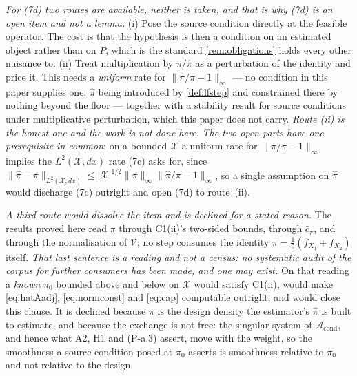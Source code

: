 \begin{remark}
\emph{For \textup{(7d)} two routes are available, neither is taken, and that is why \textup{(7d)} is an
open item and not a lemma.} \textup{(i)} Pose the source condition directly at the feasible operator.
The cost is that the hypothesis is then a condition on an estimated object rather than on $P$, which is
the standard \cref{rem:obligations} holds every other nuisance to. \textup{(ii)} Treat multiplication by
$\pi/\hat\pi$ as a perturbation of the identity and price it. This needs a \emph{uniform} rate for
$\|\hat\pi/\pi-1\|_\infty$ --- no condition in this paper supplies one, $\hat\pi$ being introduced by
\cref{def:lfstep} and constrained there by nothing beyond the floor --- together with a stability result
for source conditions under multiplicative perturbation, which this paper does not carry. \emph{Route
\textup{(ii)} is the honest one and the work is not done here.} \emph{The two open parts have one
prerequisite in common}: on a bounded $\mathcal X$ a uniform rate for $\|\hat\pi/\pi-1\|_\infty$ implies
the $L^{2}(\mathcal X,dx)$ rate \textup{(7c)} asks for, since
$\|\hat\pi-\pi\|_{L^{2}(\mathcal X,dx)}\le|\mathcal X|^{1/2}\|\pi\|_\infty\|\hat\pi/\pi-1\|_\infty$, so
a single assumption on $\hat\pi$ would discharge \textup{(7c)} outright and open \textup{(7d)} to
route~\textup{(ii)}.

\emph{A third route would dissolve the item and is declined for a stated reason.} The results proved
here read $\pi$ through C1(ii)'s two-sided bounds, through $\bar c_\pi$, and through the normalisation
of $\mathcal V$; no step consumes the identity $\pi=\tfrac12(f_{X_1}+f_{X_2})$ itself. \emph{That last
sentence is a reading and not a census: no systematic audit of the corpus for further consumers has been
made, and one may exist.} On that reading a \emph{known} $\pi_0$ bounded above and below on $\mathcal X$
would satisfy C1(ii), would make \eqref{eq:hatAadj}, \eqref{eq:normconst} and \eqref{eq:cap} computable
outright, and would close this clause. It is declined because $\pi$ is the design density the
estimator's $\hat\pi$ is built to estimate, and because the exchange is not free: the singular system of
$\mathcal A_{\mathrm{cond}}$, and hence what A2, H1 and (P-a.3) assert, move with the weight, so the
smoothness a source condition posed at $\pi_0$ asserts is smoothness relative to $\pi_0$ and not
relative to the design.
\end{remark}


